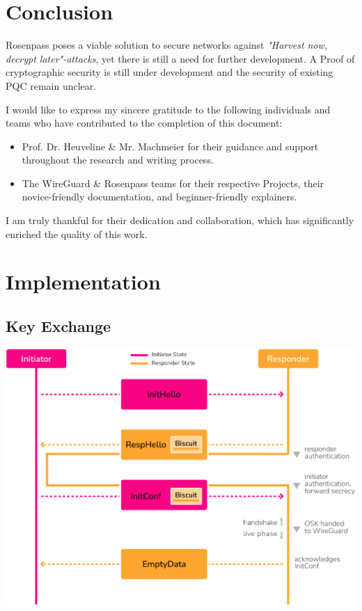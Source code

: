 \documentclass[sigconf]{acmart}
\begin{document}
\section{Conclusion}
Rosenpass poses a viable solution to secure networks against \textit{"Harvest now, decrypt later"-attacks}, yet there is still a need for further development. A Proof of cryptographic security is still under development and the security of existing PQC remain unclear.


\begin{acks}
I would like to express my sincere gratitude to the following individuals and teams who have contributed to the completion of this document:

\begin{itemize}
  \item Prof. Dr. Heuveline \& Mr. Machmeier for their guidance and support throughout the research and writing process.
  \item The WireGuard \& Rosenpass teams for their respective Projects, their novice-friendly documentation, and beginner-friendly explainers.
\end{itemize}

I am truly thankful for their dedication and collaboration, which has significantly enriched the quality of this work.
\end{acks}





\appendix

\section{Implementation}

\subsection{Key Exchange}\label{appendix:exchange}
\includegraphics[height=.35\textwidth]{graphics/rosenpass-wp-key-exchange-protocol-rgb.pdf}
\end{document}
